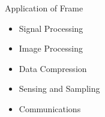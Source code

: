 \documentclass{beamer}
\begin{document}
\begin{frame}{Application of Frame}
  \begin{itemize}

  \item Signal Processing
  
  \item Image Processing
  
  \item Data Compression
  
  \item Sensing and Sampling
  
  \item Communications
  
  \cite{casazza2012finite}
  \end{itemize}
\end{frame}
\end{document}
